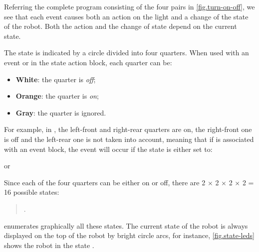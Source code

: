 Referring the complete program consisting of the four pairs in \cref{fig.turn-on-off}, we see that
each event causes both an action on the light and a change of the state
of the robot. Both the action and the change of state depend on the
current state.

\newpage


The state is indicated by a circle divided into four quarters.
When used with an event or in the state action block, each quarter can be:
\begin{itemize}
\item \textbf{White}: the quarter is \emph{off};
\item \textbf{Orange}: the quarter is \emph{on};
\item \textbf{Gray}: the quarter is ignored.
\end{itemize}

For example, in , the left-front and right-rear quarters are on, the
right-front one is off and the left-rear one is not taken into account,
meaning that if  is associated with an event block, the
event will occur if the state is either set to:
\begin{center}
\centering {}\quad or \quad {}
\end{center}

Since each of the four quarters can be either on or off, there are 2 $\times$ 2 $\times$ 2 $\times$ 2 = 16 possible states:
\begin{quote}
.
\end{quote}
 enumerates graphically all these states.
The current state of the robot is always displayed on the top of the robot by bright circle arcs, for instance, \cref{fig.state-leds} shows the robot in the state .


